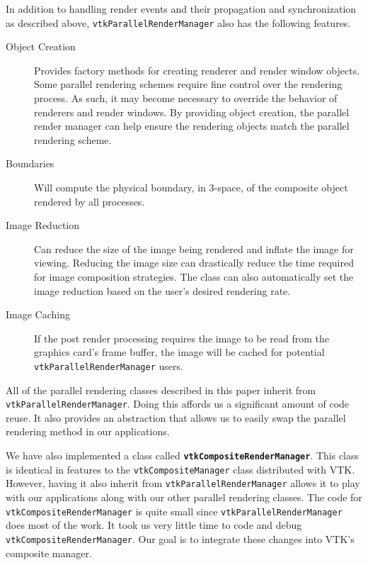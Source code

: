 \documentclass{acmsiggraph}
\newcommand{\cidentifier}[1]{\texttt{#1}}
\newcommand{\keyterm}[1]{\textbf{#1}}
\begin{document}
  In addition to handling render events and their propagation and
  synchronization as described above,
  \cidentifier{vtk\-Parallel\-Render\-Manager} also has the following
  features.
  \begin{description}
    \item [Object Creation] Provides factory methods for creating renderer
      and render window objects.  Some parallel rendering schemes require
      fine control over the rendering process.  As such, it may become
      necessary to override the behavior of renderers and render windows.
      By providing object creation, the parallel render manager can help
      ensure the rendering objects match the parallel rendering scheme.
    \item [Boundaries] Will compute the physical boundary, in 3-space, of
      the composite object rendered by all processes.
    \item [Image Reduction] Can reduce the size of the image being rendered
      and inflate the image for viewing.  Reducing the image size can
      drastically reduce the time required for image composition
      strategies.  The class can also automatically set the image reduction
      based on the user's desired rendering rate.
    \item [Image Caching] If the post render processing requires the image
      to be read from the graphics card's frame buffer, the image will be
      cached for potential \cidentifier{vtk\-Parallel\-Render\-Manager}
      users.
  \end{description}

  All of the parallel rendering classes described in this paper inherit
  from \cidentifier{vtk\-Parallel\-Render\-Manager}.  Doing this affords us
  a significant amount of code reuse.  It also provides an abstraction that
  allows us to easily swap the parallel rendering method in our
  applications.

  We have also implemented a class called
  \keyterm{\cidentifier{vtk\-Composite\-Render\-Manager}}.  This class is
  identical in features to the \cidentifier{vtk\-Composite\-Manager} class
  distributed with VTK.  However, having it also inherit from
  \cidentifier{vtk\-Parallel\-Render\-Manager} allows it to play with our
  applications along with our other parallel rendering classes.  The code
  for \cidentifier{vtk\-Composite\-Render\-Manager} is quite small since
  \cidentifier{vtk\-Parallel\-Render\-Manager} does most of the work.  It
  took us very little time to code and debug
  \cidentifier{vtk\-Composite\-Render\-Manager}.  Our goal is to integrate
  these changes into VTK's composite manager.
\end{document}

